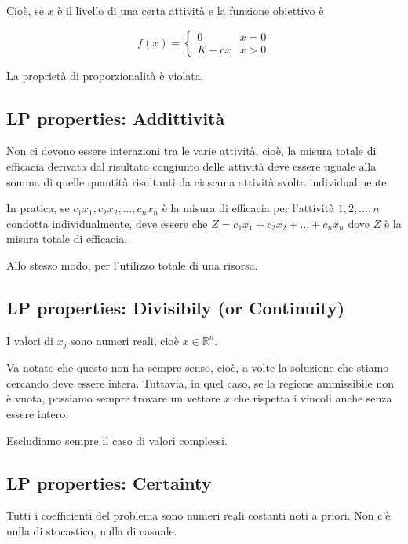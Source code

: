 \documentclass[a4paper, 11pt]{article}
\begin{document}
        Cioè, se $x$ è il livello di una certa attività e la funzione obiettivo è

        $$
            f(x) = \begin{cases}
            0 & x = 0 \\
            K + cx & x > 0
            \end{cases}
        $$

        La proprietà di proporzionalità è violata.
        
        \subsection{LP properties: Addittività}
        
        Non ci devono essere interazioni tra le varie attività, cioè, la misura totale di efficacia derivata dal risultato congiunto delle attività deve essere uguale alla somma di quelle quantità risultanti da ciascuna attività svolta individualmente.

        In pratica, se $c_1 x_1, c_2 x_2, \dots, c_n x_n$ è la misura di efficacia per l'attività $1, 2, \dots, n$ condotta individualmente, deve essere che $Z = c_1 x_1 + c_2 x_2 + \dots + c_n x_n$ dove $Z$ è la misura totale di efficacia.

        Allo stesso modo, per l'utilizzo totale di una risorsa.

        \subsection{LP properties: Divisibily (or Continuity)}

        I valori di $x_j$ sono numeri reali, cioè $x \in \mathbb{R}^n$.

        Va notato che questo non ha sempre senso, cioè, a volte la soluzione che stiamo cercando deve essere intera. Tuttavia, in quel caso, se la regione ammissibile non è vuota, possiamo sempre trovare un vettore $x$ che rispetta i vincoli anche senza essere intero.

        Escludiamo sempre il caso di valori complessi.
      
        \subsection{LP properties: Certainty}
        Tutti i coefficienti del problema sono numeri reali costanti noti a priori. Non c'è nulla di stocastico, nulla di casuale.
\end{document}
